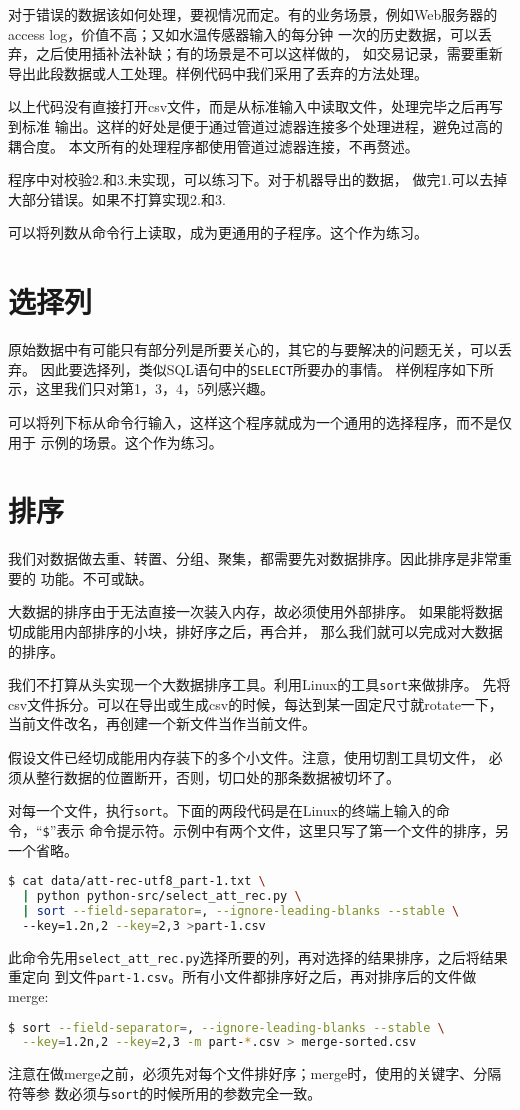 \documentclass[11pt]{article}
\newcommand{\id}[1]{\texttt{#1}}
\begin{document}
对于错误的数据该如何处理，要视情况而定。有的业务场景，例如Web服务器的
access log，价值不高；又如水温传感器输入的每分钟
一次的历史数据，可以丢弃，之后使用插补法补缺；有的场景是不可以这样做的，
如交易记录，需要重新导出此段数据或人工处理。样例代码中我们采用了丢弃的方法处理。

以上代码没有直接打开csv文件，而是从标准输入中读取文件，处理完毕之后再写到标准
输出。这样的好处是便于通过管道过滤器连接多个处理进程，避免过高的耦合度。
本文所有的处理程序都使用管道过滤器连接，不再赘述。

程序中对校验2.和3.未实现，可以练习下。对于机器导出的数据，
做完1.可以去掉大部分错误。如果不打算实现2.和3.

可以将列数从命令行上读取，成为更通用的子程序。这个作为练习。

\section{选择列}
原始数据中有可能只有部分列是所要关心的，其它的与要解决的问题无关，可以丢弃。
因此要选择列，类似SQL语句中的\id{SELECT}所要办的事情。
样例程序如下所示，这里我们只对第1，3，4，5列感兴趣。


可以将列下标从命令行输入，这样这个程序就成为一个通用的选择程序，而不是仅用于
示例的场景。这个作为练习。


\section{排序} \label{sec-sort}
我们对数据做去重、转置、分组、聚集，都需要先对数据排序。因此排序是非常重要的
功能。不可或缺。

大数据的排序由于无法直接一次装入内存，故必须使用外部排序。
如果能将数据切成能用内部排序的小块，排好序之后，再合并，
那么我们就可以完成对大数据的排序。

我们不打算从头实现一个大数据排序工具。利用Linux的工具\id{sort}来做排序。
先将csv文件拆分。可以在导出或生成csv的时候，每达到某一固定尺寸就rotate一下，
当前文件改名，再创建一个新文件当作当前文件。

假设文件已经切成能用内存装下的多个小文件。注意，使用切割工具切文件，
必须从整行数据的位置断开，否则，切口处的那条数据被切坏了。

对每一个文件，执行\id{sort}。下面的两段代码是在Linux的终端上输入的命令，“\id{\$}”表示
命令提示符。示例中有两个文件，这里只写了第一个文件的排序，另一个省略。
\begin{lstlisting}[language=sh]
$ cat data/att-rec-utf8_part-1.txt \ 
  | python python-src/select_att_rec.py \ 
  | sort --field-separator=, --ignore-leading-blanks --stable \ 
  --key=1.2n,2 --key=2,3 >part-1.csv
\end{lstlisting}
此命令先用\id{select\_att\_rec.py}选择所要的列，再对选择的结果排序，之后将结果重定向
到文件\id{part-1.csv}。所有小文件都排序好之后，再对排序后的文件做merge:
\begin{lstlisting}[language=sh]
$ sort --field-separator=, --ignore-leading-blanks --stable \
  --key=1.2n,2 --key=2,3 -m part-*.csv > merge-sorted.csv
\end{lstlisting}
注意在做merge之前，必须先对每个文件排好序；merge时，使用的关键字、分隔符等参
数必须与\id{sort}的时候所用的参数完全一致。
\end{document}
